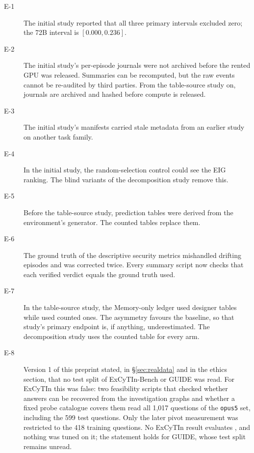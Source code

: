 \begin{description}
  \item[E-1] The initial study reported that all three primary intervals excluded zero; the 72B interval is $[0.000, 0.236]$.
  \item[E-2] The initial study's per-episode journals were not archived before the rented GPU was released. Summaries can be recomputed, but the raw events cannot be re-audited by third parties. From the table-source study on, journals are archived and hashed before compute is released.
  \item[E-3] The initial study's manifests carried stale metadata from an earlier study on another task family.
  \item[E-4] In the initial study, the random-selection control could see the EIG ranking. The blind variants of the decomposition study remove this.
  \item[E-5] Before the table-source study, prediction tables were derived from the environment's generator. The counted tables replace them.
  \item[E-6] The ground truth of the descriptive security metrics mishandled drifting episodes and was corrected twice. Every summary script now checks that each verified verdict equals the ground truth used.
  \item[E-7] In the table-source study, the Memory-only ledger used designer tables while \hesp{} used counted ones. The asymmetry favours the baseline, so that study's primary endpoint is, if anything, underestimated. The decomposition study uses the counted table for every arm.
  \item[E-8] Version 1 of this preprint stated, in \S\ref{sec:realdata} and in the ethics section, that no test split of ExCyTIn-Bench or GUIDE was read. For ExCyTIn this was false: two feasibility scripts that checked whether answers can be recovered from the investigation graphs and whether a fixed probe catalogue covers them read all 1{,}017 questions of the \texttt{opus5} set, including the 599 test questions. Only the later pivot measurement was restricted to the 418 training questions. No ExCyTIn result evaluates \hesp{}, and nothing was tuned on it; the statement holds for GUIDE, whose test split remains unread.
\end{description}
